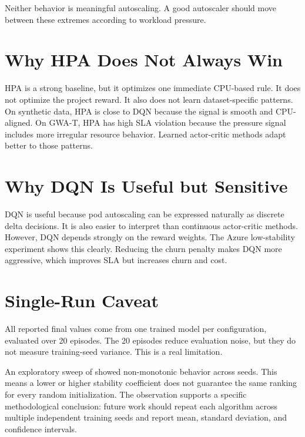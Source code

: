 \documentclass{rapportINPTCLOUD}
\newcommand{\pathcode}[1]{\texttt{\detokenize{#1}}}
\begin{document}
Neither behavior is meaningful autoscaling. A good autoscaler should move between these extremes according to workload pressure.

\section{Why HPA Does Not Always Win}

HPA is a strong baseline, but it optimizes one immediate CPU-based rule. It does not optimize the project reward. It also does not learn dataset-specific patterns. On synthetic data, HPA is close to DQN because the signal is smooth and CPU-aligned. On GWA-T, HPA has high SLA violation because the pressure signal includes more irregular resource behavior. Learned actor-critic methods adapt better to those patterns.

\section{Why DQN Is Useful but Sensitive}

DQN is useful because pod autoscaling can be expressed naturally as discrete delta decisions. It is also easier to interpret than continuous actor-critic methods. However, DQN depends strongly on the reward weights. The Azure low-stability experiment shows this clearly. Reducing the churn penalty makes DQN more aggressive, which improves SLA but increases churn and cost.

\section{Single-Run Caveat}

All reported final values come from one trained model per configuration, evaluated over 20 episodes. The 20 episodes reduce evaluation noise, but they do not measure training-seed variance. This is a real limitation.

An exploratory sweep of \pathcode{gamma_stab} showed non-monotonic behavior across seeds. This means a lower or higher stability coefficient does not guarantee the same ranking for every random initialization. The observation supports a specific methodological conclusion: future work should repeat each algorithm across multiple independent training seeds and report mean, standard deviation, and confidence intervals.
\end{document}
